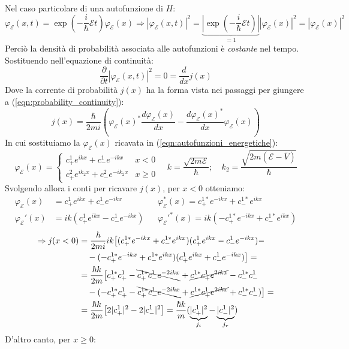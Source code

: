 \documentclass[../../FisicaTeorica.tex]{subfiles}
\begin{document}
Nel caso particolare di una autofunzione di $H$:
\[
\varphi_\mathcal{E}(x,t)=\exp\left({-\frac{i}{\hbar}\mathcal{E}t}\right)\varphi_{\mathcal{E}}(x)
\Rightarrow |\varphi_\mathcal{E}(x,t)|^2=
\underbrace{\left |\exp\left({-\frac{i}{\hbar}\mathcal{E}t}\right)\right|
}_{=1}|\varphi_\mathcal{E}(x)|^2 =|\varphi_\mathcal{E}(x)|^2
\]
Perciò la densità di probabilità associata alle autofunzioni è \textit{costante} nel tempo. Sostituendo nell'equazione di continuità:
\[
\frac{\partial}{\partial t}|\varphi_\mathcal{E}(x,t)|^2=0=
\frac{d}{dx}j(x)
\]
Dove la corrente di probabilità $j(x)$ ha la forma vista nei passaggi per giungere a (\ref{eqn:probability_continuity}):
\[
j(x)=\frac{\hbar}{2mi}\left(\varphi_\mathcal{E}(x)^* \frac{d\varphi_\mathcal{E}(x)}{dx}-\frac{d\varphi_\mathcal{E}(x)^*}{dx}\varphi_\mathcal{E}(x)\right)
\]
In cui sostituiamo la $\varphi_\mathcal{E}(x)$ ricavata in (\ref{eqn:autofunzioni_energetiche}):
\[
\varphi_\mathcal{E}(x) = \begin{cases}
c^1_+ e^{ikx}+c^1_- e^{-ikx} & x < 0\\
c^2_+ e^{ik_2 x} + c^2_- e^{-i k_2 x} & x\geq 0
\end{cases} \quad k=\frac{\sqrt{2m\mathcal{E}}}{\hbar};\quad k_2=\frac{\sqrt{2m(\mathcal{E}-\bar{V})}}{\hbar}
\]
Svolgendo allora i conti per ricavare $j(x)$, per $x<0$ otteniamo:
\begin{align*}
\varphi_\mathcal{E}(x)&=c^1_+ e^{ikx} + c^1_- e^{-ikx} && \varphi_\mathcal{E}^*(x)=c^{1*}_+ e^{-ikx}+c^{1*}_-e^{ikx}\\
\varphi_\mathcal{E}'(x)&=ik(c^1_+ e^{ikx}-c^1_-e^{-ikx})&&\varphi_\mathcal{E}'^*(x)=ik(-c^{1*}_+e^{-ikx}+c^{1*}_-e^{ikx})
\end{align*}
\begin{align*}
\Rightarrow j(x<0) &= \frac{\hbar}{2mi}ik \big [
(c^{1*}_+e^{-ikx}+c^{1*}_-e^{ikx})(c^1_+ e^{ikx}-c^1_-e^{-ikx})-
\\&\quad
-(-c^{1*}_+ e^{-ikx}+c_-^{1*}e^{ikx})(c^1_+e^{ikx}+c^1_-e^{-ikx})\big ] =\\
&=\frac{\hbar k}{2m}\big[
c^{1*}_+ c^1_+ - \bcancel{c^{1*}_+c^1_-e^{-2ikx}} + \cancel{c^{1*}_-c^1_+e^{2ikx}}-c^{1*}_-c^1_-\\
&\quad-(-c^{1*}_+c^1_+-\bcancel{c^{1*}_+c^1_-e^{-2ikx}}+\cancel{c^{1*}_-c^1_+ e^{2ikx}}+c^{1*}_-c^1_-)\big] =\\
&=\frac{\hbar k}{2m}\big[2|c^1_+|^2-2|c^1_-|^2
\big] =\frac{\hbar k}{m}(\underbrace{|c^1_+|^2}_{j_i}-\underbrace{|c^1_-|^2}_{j_r})
\end{align*}
D'altro canto, per $x\geq 0$:
\end{document}
